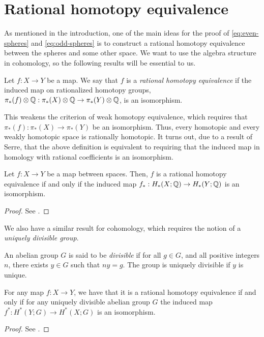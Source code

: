 \documentclass[../main.tex]{subfiles}
\begin{document}
\section{Rational homotopy equivalence}
As mentioned in the introduction, one of the main ideas for the proof
of \cref{eq:even-spheres} and \cref{eq:odd-spheres} is to construct
a rational homotopy equivalence between the spheres and some other space.
We want to use the algebra structure in cohomology,
so the following results will be essential to us.
\begin{definition}
    Let \( f:X\rightarrow Y \) be a map. We say that \( f \) is a
    \emph{rational homotopy equivalence} if the induced map on
    rationalized homotopy groups, \( \pi_*(f)\otimes\mathbb{Q}:\pi_*(X)\otimes
    \mathbb{Q}\rightarrow\pi_*(Y)\otimes\mathbb{Q}\), is an isomorphism.
\end{definition}
This weakens the criterion of weak homotopy equivalence, which requires
that \( \pi_*(f):\pi_*(X)\rightarrow\pi_*(Y) \) be an isomorphism. Thus,
every homotopic and every weakly homotopic space is rationally homotopic.
It turns out, due to a result of Serre, that the above definition is
equivalent to requiring that the induced map in homology with rational
coefficients is an isomorphism.
\begin{proposition}
    Let \( f:X \rightarrow Y \) be a map between spaces. Then, \( f \)
    is a rational homotopy equivalence if and only if the induced
    map \( f_*:H_*(X;\mathbb{Q})\rightarrow H_*(Y;\mathbb{Q}) \) is an isomorphism.
\end{proposition}
\begin{proof}
    See \cite[]{Ser53}.
\end{proof}
We also have a similar result for cohomology, which requires the notion
of a \emph{uniquely divisible group}.
\begin{definition}
    An abelian group \( G \) is said to be \emph{divisible} if for all
    \( g \in G \), and all positive integers \( n \), there exists \( y
    \in G\) such that
    \( ny=g \). The group is uniquely divisible if \( y \) is unique.
\end{definition}
\begin{proposition}
   \label{prop:rat-cohomology}
   For any map \( f:X \rightarrow Y \), we have that it is a rational
   homotopy equivalence if and only if for any uniquely divisible
   abelian group \( G \) the induced map \( f^*:H^*(Y;G)\rightarrow 
   H^*(X;G)\) is an isomorphism.
\end{proposition}
\begin{proof}
    See \cite[]{Ber12}.
\end{proof}
\end{document}
